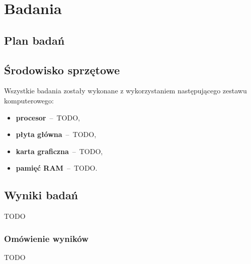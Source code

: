 \chapter{Badania}

\section{Plan badań}

\section{Środowisko sprzętowe}
Wszystkie badania zostały wykonane z wykorzystaniem następującego zestawu komputerowego:
\begin{itemize}
    \item \textbf{procesor}~--~TODO,
    \item \textbf{płyta główna}~--~TODO,
    \item \textbf{karta graficzna}~--~TODO,
    \item \textbf{pamięć RAM}~--~TODO.
\end{itemize}

\section{Wyniki badań}
TODO

\subsection{Omówienie wyników}
TODO
